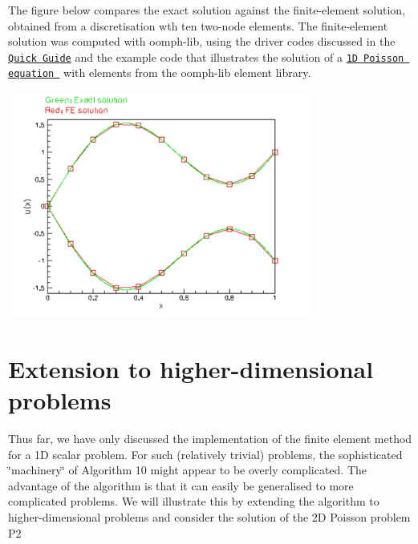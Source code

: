 The figure below compares the exact solution against the finite-\/element solution, obtained from a discretisation wth ten two-\/node elements. The finite-\/element solution was computed with {\ttfamily oomph-\/lib}, using the driver codes discussed in the \href{../../quick_guide/html/index.html}{\tt Quick Guide} and the example code that illustrates the solution of a \href{../../poisson/one_d_poisson/html/index.html}{\tt 1D Poisson equation } with elements from the {\ttfamily oomph-\/lib} element library.

 
\begin{DoxyImage}
\includegraphics[width=0.75\textwidth]{fish}
\end{DoxyImage}




 

\hypertarget{index_higher_dims}{}\section{Extension to higher-\/dimensional problems}\label{index_higher_dims}
Thus far, we have only discussed the implementation of the finite element method for a 1D scalar problem. For such (relatively trivial) problems, the sophisticated \char`\"{}machinery\char`\"{} of Algorithm 10 might appear to be overly complicated. The advantage of the algorithm is that it can easily be generalised to more complicated problems. We will illustrate this by extending the algorithm to higher-\/dimensional problems and consider the solution of the 2D Poisson problem P2

